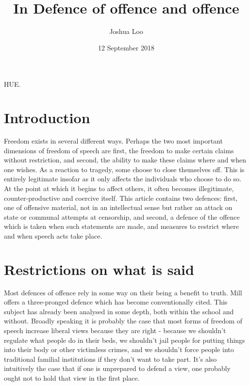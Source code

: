 \documentclass[10pt,a4paper,twoside]{article}
\begin{document}
HUE.
\clearpage

\title{In Defence of offence and offence}
\author{Joshua Loo}
\date{12 September 2018}

\maketitle

\begin{multicols}{2}

\section{Introduction}

Freedom exists in several different ways. Perhaps the two most important
dimensions of freedom of speech are first, the freedom to make certain
claims without restriction, and second, the ability to make these claims
where and when one wishes. As a reaction to tragedy, some choose to
close themselves off. This is entirely legitimate insofar as it only
affects the individuals who choose to do so. At the point at which it
begins to affect others, it often becomes illegitimate,
counter-productive and coercive itself. This article contains two
defences: first, one of offensive material, not in an intellectual sense
but rather an attack on state or communal attempts at censorship, and
second, a defence of the offence which is taken when such statements are
made, and measures to restrict where and when speech acts take place.

\section{Restrictions on what is
	said}\label{restrictions-on-what-is-said}

Most defences of offence rely in some way on their being a benefit to
truth. Mill offers a three-pronged defence which has become
conventionally cited. This subject has already been analysed in some
depth, both within the school and without. Broadly speaking it is
probably the case that most forms of freedom of speech increase liberal
views because they are right - because we shouldn't regulate what people
do in their beds, we shouldn't jail people for putting things into their
body or other victimless crimes, and we shouldn't force people into
traditional familial institutions if they don't want to take part. It's
also intuitively the case that if one is unprepared to defend a view,
one probably ought not to hold that view in the first place.


\end{multicols}
\end{document}
